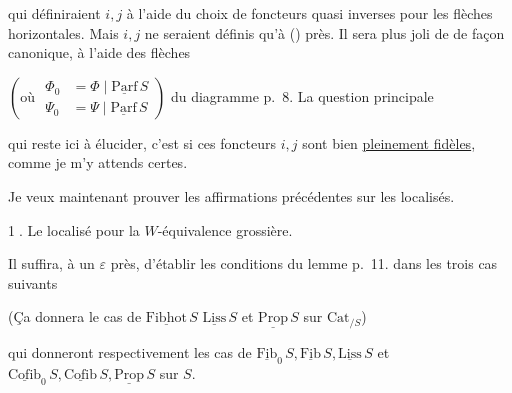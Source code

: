qui définiraient $i,j$ à l'aide du choix de foncteurs quasi inverses pour les flèches horizontales. Mais $i,j$ ne seraient définis qu'à  () près. Il sera plus joli de   de façon canonique, à l'aide des flèches


$\left(\text{où }\begin{aligned}\Phi_0&=\Phi\mid\underline{\mathrm{Parf}}\,S\\ \Psi_0&=\Psi\mid\underline{\mathrm{Parf}}\,S\end{aligned}\right)$ du diagramme p.~8. La question principale

qui reste ici à élucider, c'est si ces foncteurs $i,j$ sont bien \uline{pleinement fidèles}, comme je m'y attends certes.

Je veux maintenant prouver les affirmations précédentes sur les localisés.

\textcircled{1.} Le localisé pour la $W$-équivalence grossière.

Il suffira, à un $\varepsilon$ près, d'établir les conditions du lemme p.~11. dans les trois cas suivants


(Ça donnera le cas de $\underline{\mathrm{Fibhot}}\,S$ $\underline{\mathrm{Liss}}\,S$ et $\underline{\mathrm{Prop}}\,S$ sur $\mathrm{Cat}_{/S}$)


qui donneront respectivement les cas de  $\underline{\mathrm{Fib}}_0\,S,\underline{\mathrm{Fib}}\,S,\underline{\mathrm{Liss}}\,S$ et $\underline{\mathrm{Cofib}}_0\,S,\underline{\mathrm{Cofib}}\,S,\underline{\mathrm{Prop}}\,S$ sur $S$.

